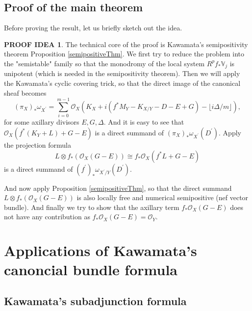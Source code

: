 \documentclass[11pt]{article}
\theoremstyle{definition}
\newtheorem{proofidea}[theorem]{PROOF IDEA}
\begin{document}
	\subsection{Proof of the main theorem}
	Before proving the result, let us briefly sketch out the idea. 
	
	\begin{proofidea}
		The technical core of the proof is Kawamata's semipositivity theorem Proposition \ref{semipositiveThm}. We first try to reduce the problem into the "semistable" family so that the monodromy of the local system $R^p f_*\mathbb{V}_j$ is unipotent (which is needed in the semipositivity theorem). Then we will apply the Kawamata's cyclic covering trick, so that the direct image of the canonical sheaf becomes$$\left(\pi_X\right)_* \omega_{X^{\prime}}=\sum_{i=0}^{m-1} \mathcal{O}_X\left(K_X+i\left(f^* M_Y-K_{X / Y}-D-E+G\right)-\lfloor i \Delta / m\rfloor\right),$$for some axillary divisors $E,G,\Delta$. And it is easy to see that $\mathcal{O}_X\left(f^*\left(K_Y+L\right)+G-E\right)$ is a direct summand of $\left(\pi_X\right)_* \omega_{X^{\prime}}\left(D^{\prime}\right)$. Apply the projection formula $$
		L \otimes f_*\left(\mathcal{O}_X(G-E)\right) \cong f_* \mathcal{O}_X\left(f^* L+G-E\right)
		$$
		is a direct summand of $\left(f^{\prime}\right)_* \omega_{X^{\prime} / Y}\left(D^{\prime}\right)$.
		
		And now apply Proposition \ref{semipositiveThm}, so that the direct summand $L\otimes f_* (\mathcal{O}_X(G-E))$ is also locally free and numerical semipositive (nef vector bundle). And finally we try to show that the axillary term $f_* \mathcal{O}_X(G-E)$ does not have any contribution as $f_* \mathcal{O}_X(G-E) = \mathcal{O}_Y$. 
	\end{proofidea}
	
	
	\section{Applications of Kawamata's canoncial bundle formula}
	\subsection{Kawamata's subadjunction formula}
	
	
	
	
\end{document}
